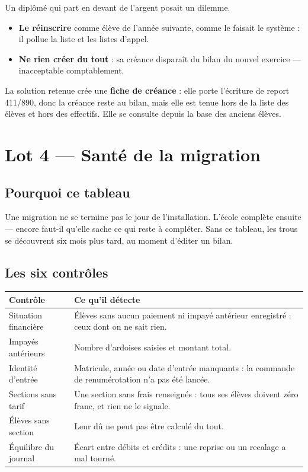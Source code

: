 \documentclass[11pt,a4paper]{report}
\begin{document}
Un diplômé qui part en devant de l'argent posait un dilemme.

\begin{itemize}
\item \textbf{Le réinscrire} comme élève de l'année suivante, comme le faisait
      le système : il pollue la liste et les listes d'appel.
\item \textbf{Ne rien créer du tout} : sa créance disparaît du bilan du nouvel
      exercice --- inacceptable comptablement.
\end{itemize}

La solution retenue crée une \textbf{fiche de créance} : elle porte l'écriture
de report 411/890, donc la créance reste au bilan, mais elle est tenue hors de
la liste des élèves et hors des effectifs. Elle se consulte depuis la base des
anciens élèves.

\chapter{Lot 4 --- Santé de la migration}

\section{Pourquoi ce tableau}

Une migration ne se termine pas le jour de l'installation. L'école complète
ensuite --- encore faut-il qu'elle sache ce qui reste à compléter. Sans ce
tableau, les trous se découvrent six mois plus tard, au moment d'éditer un
bilan.

\section{Les six contrôles}

\begin{center}
\begin{tabularx}{\linewidth}{@{}p{4.6cm}X@{}}
\toprule
\textbf{Contrôle} & \textbf{Ce qu'il détecte} \\
\midrule
Situation financière & Élèves sans aucun paiement ni impayé antérieur
  enregistré : ceux dont on ne sait rien. \\
Impayés antérieurs & Nombre d'ardoises saisies et montant total. \\
Identité d'entrée & Matricule, année ou date d'entrée manquants : la commande
  de renumérotation n'a pas été lancée. \\
Sections sans tarif & Une section sans frais renseignés : tous ses élèves
  doivent zéro franc, et rien ne le signale. \\
Élèves sans section & Leur dû ne peut pas être calculé du tout. \\
Équilibre du journal & Écart entre débits et crédits : une reprise ou un
  recalage a mal tourné. \\
\bottomrule
\end{tabularx}
\end{center}
\end{document}
